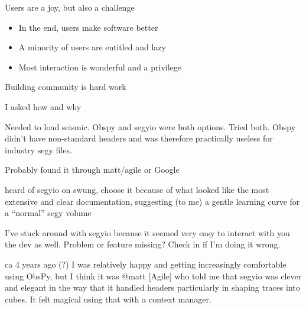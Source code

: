 \documentclass[pdf]{beamer}
\begin{document}
\begin{frame}
    Users are a joy, but also a challenge
    \begin{itemize}
        \item In the end, users make software better
        \item A minority of users are entitled and lazy
        \item Most interaction is wonderful and a privilege
    \end{itemize}
    Building community is hard work
\end{frame}

\begin{frame}
    I asked how and why
\end{frame}

\begin{frame}
    \begin{displayquote}
        Needed to load seismic. Obspy and segyio were both options. Tried both.
        Obspy didn't have non-standard headers and was therefore practically
        useless for industry segy files.

        Probably found it through matt/agile or Google
    \end{displayquote}
\end{frame}

\begin{frame}
    \begin{displayquote}
        heard of segyio on swung, choose it because of what looked like the
        most extensive and clear documentation, suggesting (to me) a gentle
        learning curve for a “normal” segy volume
    \end{displayquote}
\end{frame}

\begin{frame}
    \begin{displayquote}
        I've stuck around with segyio because it seemed very easy to interact
        with you the dev as well. Problem or feature missing? Check in if I'm
        doing it wrong.
    \end{displayquote}
\end{frame}

\begin{frame}
    \begin{displayquote}
        ca 4 years ago (?) I was relatively happy and getting increasingly
        comfortable using ObsPy, but I think it was @matt [Agile] who told me
        that segyio was clever and elegant in the way that it handled headers
        particularly in shaping traces into cubes. It felt magical using that
        with a context manager.
    \end{displayquote}
\end{frame}
\end{document}
